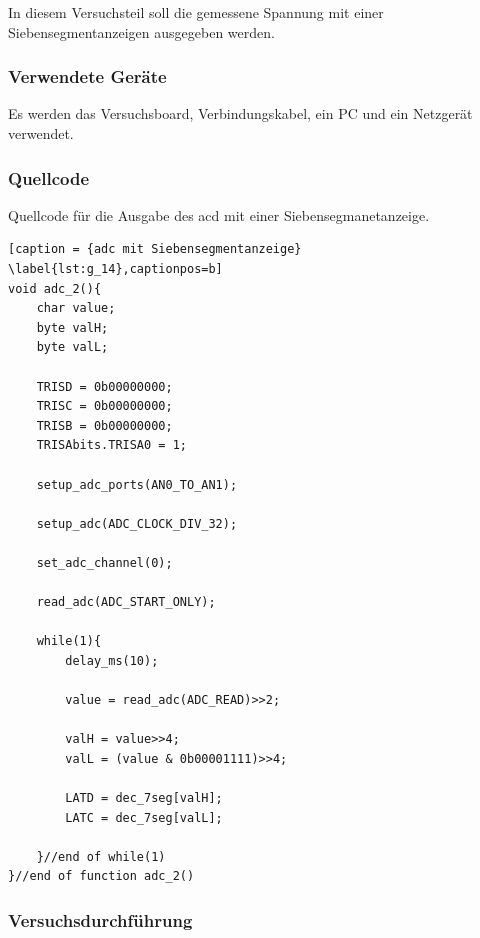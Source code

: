\documentclass[12pt,a4paper]{article}
\begin{document}
In diesem Versuchsteil soll die gemessene Spannung mit einer Siebensegmentanzeigen ausgegeben werden.

\subsubsection*{Verwendete Geräte}

Es werden das Versuchsboard, Verbindungskabel, ein PC und ein Netzgerät verwendet.

\subsubsection*{Quellcode}

Quellcode für die Ausgabe des acd mit einer Siebensegmanetanzeige.

\lstset{language=C, basicstyle=\tiny}
\begin{lstlisting}[caption = {adc mit Siebensegmentanzeige} \label{lst:g_14},captionpos=b]
void adc_2(){
	char value;
	byte valH;
	byte valL;

	TRISD = 0b00000000;
	TRISC = 0b00000000;
	TRISB = 0b00000000;
	TRISAbits.TRISA0 = 1;

	setup_adc_ports(AN0_TO_AN1);
	
	setup_adc(ADC_CLOCK_DIV_32);
	
	set_adc_channel(0);
	
	read_adc(ADC_START_ONLY);
	
	while(1){
		delay_ms(10);
		
		value = read_adc(ADC_READ)>>2;
		
		valH = value>>4;
		valL = (value & 0b00001111)>>4;
		
		LATD = dec_7seg[valH];
		LATC = dec_7seg[valL];
		
	}//end of while(1)
}//end of function adc_2()
\end{lstlisting}

\subsubsection*{Versuchsdurchführung}
\end{document}
